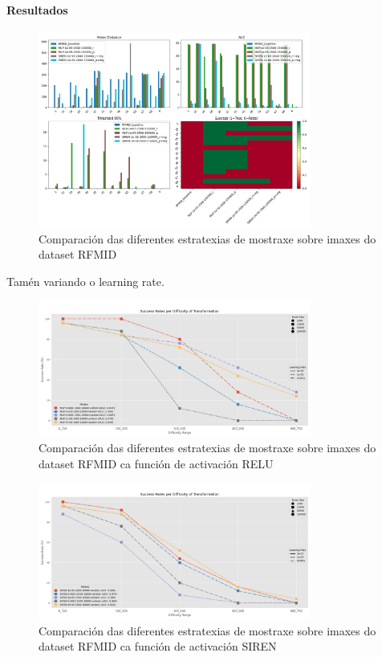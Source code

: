 \paragraph{Resultados}
\label{par:Resultados}


\begin{figure}[ht]
    \centering
    \includegraphics[width=0.8\textwidth]{imaxes/RFMID_both__comp_sampling.png}
    \caption{Comparación das diferentes estratexias de mostraxe sobre imaxes do dataset RFMID}
    \label{fig:sampling_comparison}
\end{figure}

Tamén variando o learning rate.

\begin{figure}[ht]
    \centering
    \includegraphics[width=0.8\textwidth]{imaxes/experiment_plot_RFMID_MLP_RvsU.png}
    \caption{Comparación das diferentes estratexias de mostraxe sobre imaxes do dataset RFMID ca función de activación RELU}
    \label{fig:sampling_comparison_relu}
\end{figure}

\begin{figure}[ht]
    \centering
    \includegraphics[width=0.8\textwidth]{imaxes/experiment_plot_RFMID_SIREN_RvsU.png}
    \caption{Comparación das diferentes estratexias de mostraxe sobre imaxes do dataset RFMID ca función de activación SIREN}
    \label{fig:sampling_comparison_SIREN}
\end{figure}



